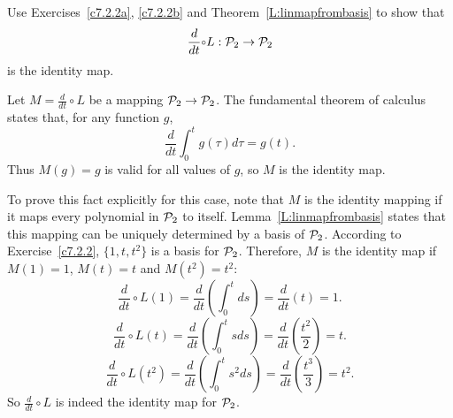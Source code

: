 \documentclass{ximera}
\begin{document}
\begin{exercise}  \label{c7.2.2c}
Use Exercises~\ref{c7.2.2a}, \ref{c7.2.2b} and
Theorem~\ref{L:linmapfrombasis} to show that
\[
\frac{d}{dt}\compose L:{\cal P}_2\to{\cal P}_2
\]
is the identity map.

\begin{solution}

\soln
Let $M = \frac{d}{dt} \circ L$ be a mapping ${\cal P}_2
\rightarrow {\cal P}_2$.  The fundamental
theorem of calculus states that, for any function $g$,
\[ \frac{d}{dt}\int_0^t g(\tau)d\tau = g(t). \]
Thus $M(g) = g$ is valid for all values of $g$, so $M$ is the
identity map.

\para To prove this fact explicitly for this case, note that $M$ is
the identity mapping if it maps every polynomial in ${\cal P}_2$ to
itself.  Lemma~\ref{L:linmapfrombasis} states that this mapping can
be uniquely determined by a basis of ${\cal P}_2$.  According to
Exercise~\ref{c7.2.2}, $\{1,t,t^2\}$ is a basis for ${\cal P}_2$. 
Therefore, $M$ is the identity map if $M(1) = 1$, $M(t) = t$ and
$M(t^2) = t^2$:
\[ \frac{d}{dt} \circ L (1) = \frac{d}{dt}\left(\int_0^tds\right) =
\frac{d}{dt}(t) = 1. \]
\[ \frac{d}{dt} \circ L (t) = \frac{d}{dt}\left(\int_0^tsds\right) =
\frac{d}{dt}\left(\frac{t^2}{2}\right) = t. \]
\[ \frac{d}{dt} \circ L (t^2) = \frac{d}{dt}\left(\int_0^ts^2ds\right) =
\frac{d}{dt}\left(\frac{t^3}{3}\right) = t^2. \]
So $\frac{d}{dt} \circ L$ is indeed the identity map for ${\cal P}_2$.

\end{solution}
\end{exercise}
\end{document}
